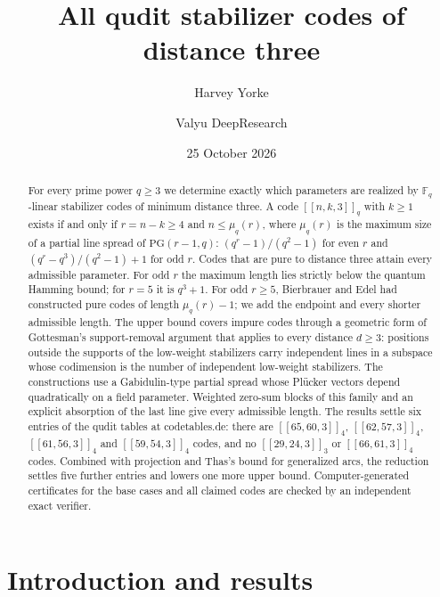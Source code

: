 \documentclass[11pt]{amsart}
\title{All qudit stabilizer codes of distance three}
\author{Harvey Yorke}
\author{Valyu DeepResearch}
\date{25 October 2026}
\theoremstyle{definition}
\theoremstyle{remark}
\newcommand{\F}{\mathbb F}
\newcommand{\qq}[1]{[\![#1]\!]}
\begin{document}
\raggedbottom
\begin{abstract}
For every prime power $q\ge3$ we determine exactly which parameters are realized by $\F_q$-linear stabilizer codes of minimum distance three. A code $\qq{n,k,3}_q$ with $k\ge1$ exists if and only if $r=n-k\ge4$ and $n\le\mu_q(r)$, where $\mu_q(r)$ is the maximum size of a partial line spread of $\mathrm{PG}(r-1,q)$: $(q^r-1)/(q^2-1)$ for even $r$ and $(q^r-q^3)/(q^2-1)+1$ for odd $r$. Codes that are pure to distance three attain every admissible parameter. For odd $r$ the maximum length lies strictly below the quantum Hamming bound; for $r=5$ it is $q^3+1$. For odd $r\ge5$, Bierbrauer and Edel had constructed pure codes of length $\mu_q(r)-1$; we add the endpoint and every shorter admissible length. The upper bound covers impure codes through a geometric form of Gottesman's support-removal argument that applies to every distance $d\ge3$: positions outside the supports of the low-weight stabilizers carry independent lines in a subspace whose codimension is the number of independent low-weight stabilizers. The constructions use a Gabidulin-type partial spread whose Pl\"ucker vectors depend quadratically on a field parameter. Weighted zero-sum blocks of this family and an explicit absorption of the last line give every admissible length. The results settle six entries of the qudit tables at codetables.de: there are $\qq{65,60,3}_4$, $\qq{62,57,3}_4$, $\qq{61,56,3}_4$ and $\qq{59,54,3}_4$ codes, and no $\qq{29,24,3}_3$ or $\qq{66,61,3}_4$ codes. Combined with projection and Thas's bound for generalized arcs, the reduction settles five further entries and lowers one more upper bound. Computer-generated certificates for the base cases and all claimed codes are checked by an independent exact verifier.
\end{abstract}
\maketitle

\section{Introduction and results}
\end{document}

